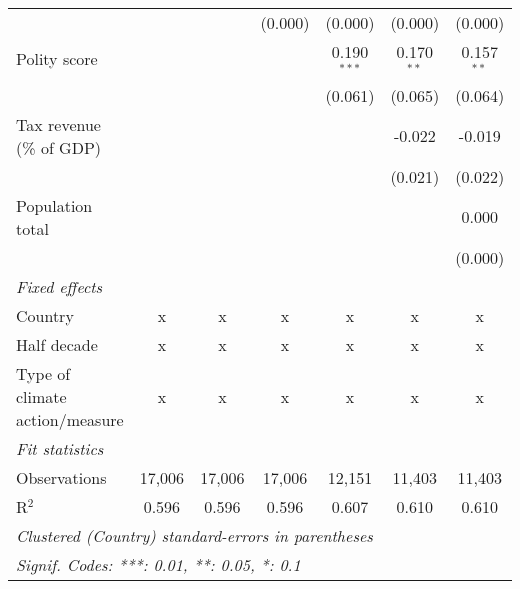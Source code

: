 \begin{tabular}{lcccccc}
                                                                                    &               &                & (0.000)        & (0.000)        & (0.000)        & (0.000)\\   
   Polity score                                                                     &               &                &                & 0.190$^{***}$  & 0.170$^{**}$   & 0.157$^{**}$\\   
                                                                                    &               &                &                & (0.061)        & (0.065)        & (0.064)\\   
   Tax revenue (\% of GDP)                                                          &               &                &                &                & -0.022         & -0.019\\   
                                                                                    &               &                &                &                & (0.021)        & (0.022)\\   
   Population total                                                                 &               &                &                &                &                & 0.000\\   
                                                                                    &               &                &                &                &                & (0.000)\\   
   \emph{Fixed effects}\\
   Country                                                                          & x             & x              & x              & x              & x              & x\\  
   Half decade                                                                      & x             & x              & x              & x              & x              & x\\  
   Type of climate action/measure                                                   & x             & x              & x              & x              & x              & x\\  
   \midrule \emph{Fit statistics}\\
   Observations                                                                     & 17,006        & 17,006         & 17,006         & 12,151         & 11,403         & 11,403\\  
   R$^2$                                                                            & 0.596         & 0.596          & 0.596          & 0.607          & 0.610          & 0.610\\  
   \midrule
   \multicolumn{7}{l}{\emph{Clustered (Country) standard-errors in parentheses}}\\
   \multicolumn{7}{l}{\emph{Signif. Codes: ***: 0.01, **: 0.05, *: 0.1}}\\
\end{tabular}
\par\endgroup


